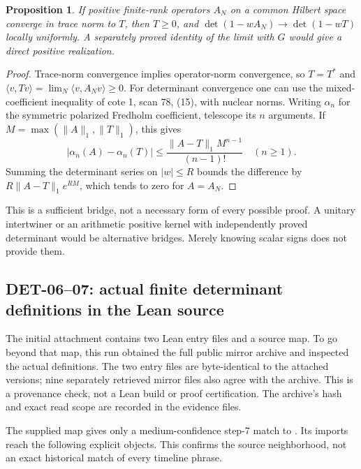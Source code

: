 \documentclass[11pt,a4paper]{article}
\newtheorem*{proposition}{Proposition}
\begin{document}
\begin{proposition}
If positive finite-rank operators $A_N$ on a common Hilbert space converge in trace norm to $T$, then $T\ge0$, and $\det(1-wA_N)\to\det(1-wT)$ locally uniformly. A separately proved identity of the limit with $G$ would give a direct positive realization.
\end{proposition}
\begin{proof}
Trace-norm convergence implies operator-norm convergence, so $T=T^*$ and $\langle v,Tv\rangle=\lim_N\langle v,A_Nv\rangle\ge0$. For determinant convergence one can use the mixed-coefficient inequality of cote 1, scan 78, (15), with nuclear norms. Writing $\alpha_n$ for the symmetric polarized Fredholm coefficient, telescope its $n$ arguments. If $M=\max(\|A\|_1,\|T\|_1)$, this gives
\[
 |\alpha_n(A)-\alpha_n(T)|\le
 \frac{\|A-T\|_1M^{n-1}}{(n-1)!}\quad(n\ge1).
\]
Summing the determinant series on $|w|\le R$ bounds the difference by
$R\|A-T\|_1e^{RM}$, which tends to zero for $A=A_N$.
\end{proof}
This is a sufficient bridge, not a necessary form of every possible proof. A unitary intertwiner or an arithmetic positive kernel with independently proved determinant would be alternative bridges. Merely knowing scalar signs does not provide them.


\subsection{DET-06--07: actual finite determinant definitions in the Lean source}
The initial attachment contains two Lean entry files and a source map. To go beyond that map, this run obtained the full public mirror archive and inspected the actual definitions. The two entry files are byte-identical to the attached versions; nine separately retrieved mirror files also agree with the archive. This is a provenance check, not a Lean build or proof certification. The archive's hash and exact read scope are recorded in the evidence files.

The supplied map gives only a medium-confidence step-7 match to . Its imports reach the following explicit objects. This confirms the source neighborhood, not an exact historical match of every timeline phrase.
\end{document}
